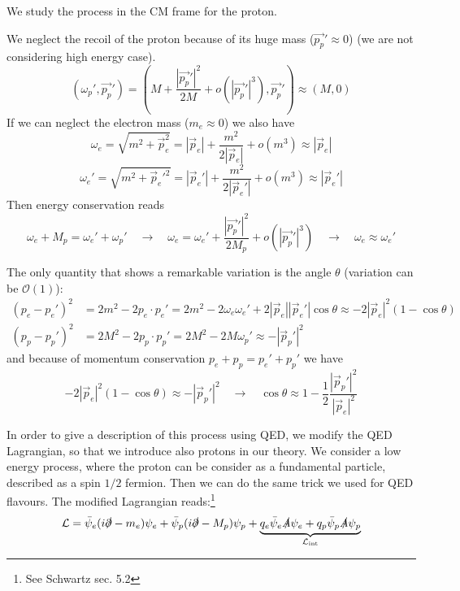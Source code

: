 \documentclass[TheoreticalPhy_ModB.tex]{subfiles}
\begin{document}
\skipline

We study the process in the CM frame for the proton.

\begin{figure}[H]
\centering

\end{figure}

We neglect the recoil of the proton because of its huge mass ($\vec{p_{p}}'\approx0$) (we are not considering high energy case). 
\[\left( \omega_{p} ',\vec{p_{p}} '\right)=\left( M+\frac{|\vec{p_{p}}'|^2}{2M}+o\left(|\vec{p_{p}}'|^{3}\right) ,\vec{p_{p}}'\right)\approx(M,0)\]
If we can neglect the electron mass ($m_e\approx0$) we also have
\[\omega_e=\sqrt{m^2+\vec p_e^2}=|\vec p_e|+\frac{m^2}{2|\vec p_e|}+o(m^3)\approx|\vec p_e|\]
\[\omega_e'=\sqrt{m^2+\vec p_e'^2}=|\vec p_e'|+\frac{m^2}{2|\vec p_e'|}+o(m^3)\approx|\vec p_e'|\]
Then energy conservation reads
\[\omega_e+M_p=\omega_e'+\omega_p'
\quad\rightarrow\quad
\omega_e=\omega_e'+\frac{|\vec{p_{p}}'|^2}{2M_p}+o\left(|\vec{p_{p}}'|^{3}\right)
\quad\rightarrow\quad
\omega_e\approx\omega_e'
\]

The only quantity that shows a remarkable variation is the angle $\theta$ (variation can be $\mathcal O(1)$):
\begin{align*}
(p_e-p_e')^2&=2m^2-2p_e\cdot p_e'=2m^2-2\omega_e\omega_e'+2|\vec p_e||\vec p_e'|\cos\theta\approx-2|\vec p_e|^2(1-\cos\theta)\\
(p_p-p_p')^2&=2M^2-2p_p\cdot p_p'=2M^2-2M\omega_p'\approx-|\vec p_p'|^2
\end{align*}
and because of momentum conservation $p_e+p_p=p_e'+p_p'$ we have
\[-2|\vec p_e|^2(1-\cos\theta)\approx-|\vec p_p'|^2
\quad\rightarrow\quad
\cos\theta\approx 1-\frac12\frac{|\vec p_p'|^2}{|\vec p_e|^2}\]

\skipline

In order to give a description of this process using QED, we modify the QED Lagrangian, so that we introduce also protons in our theory. We consider a low energy process, where the proton can be consider as a fundamental particle, described as a spin $1/2$ fermion. Then we can do the same trick we used for QED flavours. The modified Lagrangian reads:\footnote{\textsf{See Schwartz sec. 5.2}}
\[\mathcal L=\bar\psi_e(i\slashed\partial-m_e)\psi_e+\bar\psi_p(i\slashed\partial-M_p)\psi_p+\underbrace{q_e\bar\psi_e\slashed A\psi_e+q_p\bar\psi_p\slashed A\psi_p}_{\mathcal L_{\textup{int}}}\]
\end{document}
